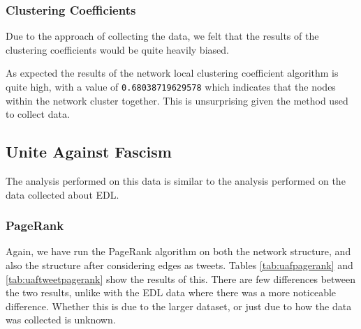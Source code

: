 \subsubsection{Clustering Coefficients}
Due to the approach of collecting the data, we felt that the results of the clustering coefficients would be quite heavily biased. 

As expected the results of the network local clustering coefficient algorithm is quite high, with a value of \verb/0.68038719629578/ which indicates that the nodes within the network cluster together. This is unsurprising given the method used to collect data.

\subsection{Unite Against Fascism}
The analysis performed on this data is similar to the analysis performed on the data collected about EDL. 

\subsubsection{PageRank}
Again, we have run the PageRank algorithm on both the network structure, and also the structure after considering edges as tweets. Tables \ref{tab:uafpagerank} and \ref{tab:uaftweetpagerank} show the results of this. There are few differences between the two results, unlike with the EDL data where there was a more noticeable difference. Whether this is due to the larger dataset, or just due to how the data was collected is unknown.

